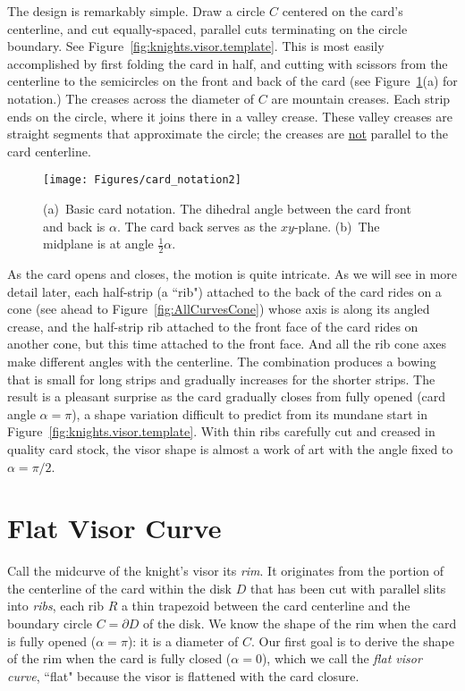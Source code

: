 \pdfoutput=1  \documentclass[]{article}
\newcommand{\figlab}[1]{\label{fig:#1}}
\newcommand{\figref}[1]{\ref{fig:#1}}
\def\a{{\alpha}}
\begin{document}
The design is remarkably simple.
Draw a circle $C$ centered on the card's centerline, and cut equally-spaced,
parallel cuts terminating on the circle boundary.
See Figure~\figref{knights.visor.template}.
This is most easily accomplished by first folding the card in half, and cutting with scissors from the centerline
to the semicircles on the front and back of the card
(see Figure~\figref{card.notation}(a) for notation.)
The creases across the diameter of $C$ are mountain creases.
Each strip ends on the circle, where it joins there in a valley crease.
These valley creases are straight segments that approximate the circle;
the creases are \underline{not} parallel to the card centerline.

\begin{figure}[htbp]
\centering
\texttt{[image: Figures/card\_notation2]}
\caption{(a)~Basic card notation.  
The dihedral angle between the card front and back is $\a$.  The card back serves
as the $xy$-plane.
(b)~The midplane is at angle $\frac{1}{2}\a$.}
\figlab{card.notation}
\end{figure}



As the card opens and closes, the motion is quite intricate.
As we will see in more detail later,
each half-strip (a ``rib") attached to the back
of the card rides on a cone (see ahead to Figure~\figref{AllCurvesCone})
whose axis is along its angled crease, 
and the half-strip rib attached to the front face of the card rides on another cone,
but this time attached to the front face.  And all the rib cone axes make different
angles with the centerline.  The combination produces a bowing that is small for long strips
and gradually increases for the shorter strips.
The result is a pleasant surprise as the card gradually closes from
fully opened (card angle $\a=\pi$), a shape variation difficult to predict from 
its mundane start in Figure~\figref{knights.visor.template}.
With thin ribs carefully cut and creased in quality card stock, 
the visor shape is almost a work of art with the angle fixed to $\a=\pi/2$.


\section{Flat Visor Curve}
Call the midcurve of the knight's visor its \emph{rim}.
It originates from the portion of the centerline of the card within the disk $D$
that has been cut with parallel slits into \emph{ribs}, each rib $R$ a thin
trapezoid between the card centerline and the boundary circle $C = \partial D$ of the disk.
We know the shape of the rim when the card is fully opened ($\a=\pi$): it is a diameter
of $C$.
Our first goal is to derive the shape of the rim when the card is fully closed ($\a=0$), which
we call the \emph{flat visor curve}, ``flat" because the visor is flattened with the card closure.
\end{document}
